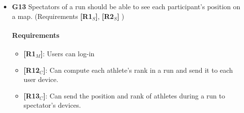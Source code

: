 \begin{itemize}
   
   
    \item \textbf{G13} Spectators of a run should be able to see each participant's position on a map. (Requirements \textbf{[R1$_S$]}, \textbf{[R2$_S$]} )
    \paragraph{Requirements}
   \begin{itemize}
    \item \textbf{[R1$_M$]}: Users can log-in
    \item \textbf{[R12$_C$]}: Can compute each athlete's rank in a run and send it to each user device.
    \item \textbf{[R13$_C$]}: Can send the position and rank of athletes during a run to spectator's devices.
   \end{itemize}
   
   \end{itemize}
   

   
   